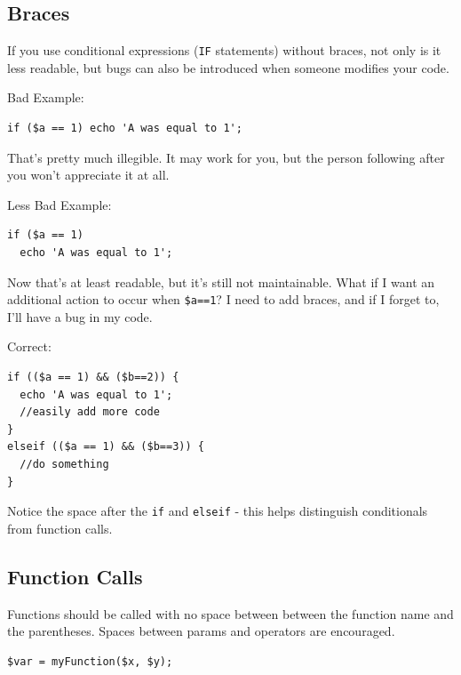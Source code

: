 \documentclass[headexclude,footexclude,12pt,BCOR0pt,DIV15]{scrartcl}
\begin{document}
    \subsection{Braces}
        If you use conditional expressions (\texttt{IF} statements) without braces, not only is it less readable,
        but bugs can also be introduced when someone modifies your code.
        \begin{description}
        \item{Bad Example:}
\begin{lstlisting}[stepnumber=0,frame={}]
if ($a == 1) echo 'A was equal to 1';
\end{lstlisting}

        That's pretty much illegible. It may work for you, but the person following after you won't appreciate it at all.

        \item{Less Bad Example:}
\begin{lstlisting}[stepnumber=0,frame={}]
if ($a == 1)
  echo 'A was equal to 1';
\end{lstlisting}

        Now that's at least readable, but it's still not maintainable. What if I want an additional action to occur when
        \texttt{\$a==1}? I need to add braces, and if I forget to, I'll have a bug in my code.

        \item{Correct:}
\begin{lstlisting}[stepnumber=0,frame={}]
if (($a == 1) && ($b==2)) {
  echo 'A was equal to 1';
  //easily add more code
}
elseif (($a == 1) && ($b==3)) {
  //do something
}
\end{lstlisting}

            Notice the space after the \texttt{if} and \texttt{elseif} - this helps distinguish conditionals from function calls.
        \end{description}

    \subsection{Function Calls}
        Functions should be called with no space between between the function name and the parentheses.
        Spaces between params and operators are encouraged.

\begin{lstlisting}[stepnumber=0,frame={}]
$var = myFunction($x, $y);
\end{lstlisting}
\end{document}
